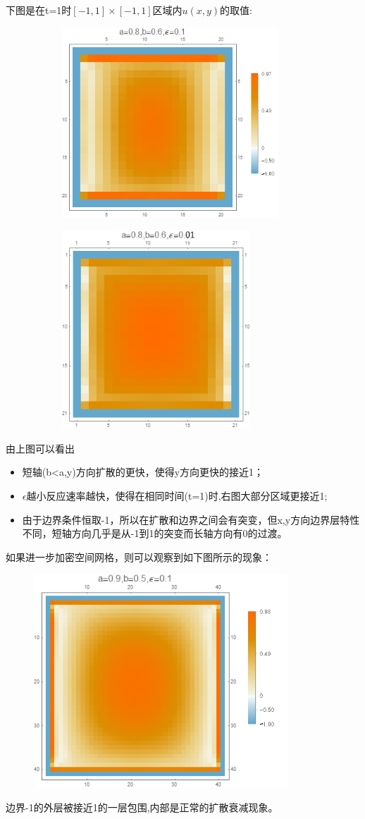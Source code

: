 \documentclass[12pt]{article}
\theoremstyle{remark}
\begin{document}
下图是在t=1时$[-1,1]\times[-1,1]$区域内$u(x,y)$的取值:
\newpage
\begin{figure}[!ht]
  \centering
	\begin{subfigure}[t]{.5\linewidth}
		\centering
		\includegraphics[width=230pt]{matrixPlot1.png}
	\end{subfigure}
	\quad
	\begin{subfigure}[t]{.3\linewidth}
		\centering
		\includegraphics[width=200pt]{matrixPlot2.png}
	\end{subfigure}
\end{figure}

由上图可以看出
\begin{itemize}
\item 短轴(b<a,y)方向扩散的更快，使得y方向更快的接近1；
\item $\epsilon$越小反应速率越快，使得在相同时间(t=1)时,右图大部分区域更接近1;
\item 由于边界条件恒取-1，所以在扩散和边界之间会有突变，但x,y方向边界层特性不同，短轴方向几乎是从-1到1的突变而长轴方向有0的过渡。
\end{itemize}
如果进一步加密空间网格，则可以观察到如下图所示的现象：

\begin{figure}[!ht]
  \centering
  \includegraphics[width=270pt]{matrixPlot3.png}
\end{figure}

边界-1的外层被接近1的一层包围,内部是正常的扩散衰减现象。
\end{document}
